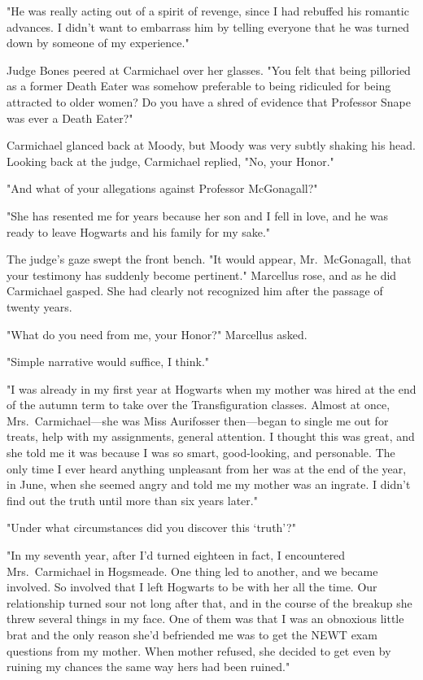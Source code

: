 "He was really acting out of a spirit of revenge, since I had rebuffed his romantic advances. I didn't want to embarrass him by telling everyone that he was turned down by someone of my experience."

Judge Bones peered at Carmichael over her glasses. "You felt that being pilloried as a former Death Eater was somehow preferable to being ridiculed for being attracted to older women? Do you have a shred of evidence that Professor Snape was ever a Death Eater?"

Carmichael glanced back at Moody, but Moody was very subtly shaking his head. Looking back at the judge, Carmichael replied, "No, your Honor."

"And what of your allegations against Professor McGonagall?"

"She has resented me for years because her son and I fell in love, and he was ready to leave Hogwarts and his family for my sake."

The judge's gaze swept the front bench. "It would appear, Mr.~McGonagall, that your testimony has suddenly become pertinent." Marcellus rose, and as he did Carmichael gasped. She had clearly not recognized him after the passage of twenty years.

"What do you need from me, your Honor?" Marcellus asked.

"Simple narrative would suffice, I think."

"I was already in my first year at Hogwarts when my mother was hired at the end of the autumn term to take over the Transfiguration classes. Almost at once, Mrs.~Carmichael—she was Miss Aurifosser then—began to single me out for treats, help with my assignments, general attention. I thought this was great, and she told me it was because I was so smart, good-looking, and personable. The only time I ever heard anything unpleasant from her was at the end of the year, in June, when she seemed angry and told me my mother was an ingrate. I didn't find out the truth until more than six years later."

"Under what circumstances did you discover this `truth'?"

"In my seventh year, after I'd turned eighteen in fact, I encountered Mrs.~Carmichael in Hogsmeade. One thing led to another, and we became involved. So involved that I left Hogwarts to be with her all the time. Our relationship turned sour not long after that, and in the course of the breakup she threw several things in my face. One of them was that I was an obnoxious little brat and the only reason she'd befriended me was to get the NEWT exam questions from my mother. When mother refused, she decided to get even by ruining my chances the same way hers had been ruined."


